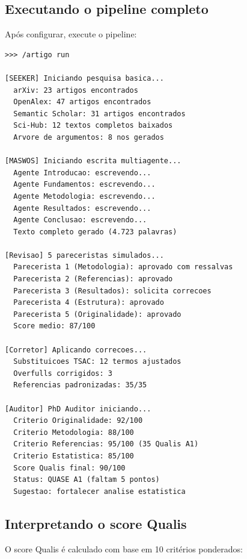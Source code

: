 \subsection{Executando o pipeline completo}
\label{subsec:exec-artigo}

Após configurar, execute o pipeline:

\begin{lstlisting}[style=bashstyle, caption={Executando o pipeline
completo de produção}, label={lst:artigo-run}]
>>> /artigo run

[SEEKER] Iniciando pesquisa basica...
  arXiv: 23 artigos encontrados
  OpenAlex: 47 artigos encontrados
  Semantic Scholar: 31 artigos encontrados
  Sci-Hub: 12 textos completos baixados
  Arvore de argumentos: 8 nos gerados

[MASWOS] Iniciando escrita multiagente...
  Agente Introducao: escrevendo...
  Agente Fundamentos: escrevendo...
  Agente Metodologia: escrevendo...
  Agente Resultados: escrevendo...
  Agente Conclusao: escrevendo...
  Texto completo gerado (4.723 palavras)

[Revisao] 5 pareceristas simulados...
  Parecerista 1 (Metodologia): aprovado com ressalvas
  Parecerista 2 (Referencias): aprovado
  Parecerista 3 (Resultados): solicita correcoes
  Parecerista 4 (Estrutura): aprovado
  Parecerista 5 (Originalidade): aprovado
  Score medio: 87/100

[Corretor] Aplicando correcoes...
  Substituicoes TSAC: 12 termos ajustados
  Overfulls corrigidos: 3
  Referencias padronizadas: 35/35

[Auditor] PhD Auditor iniciando...
  Criterio Originalidade: 92/100
  Criterio Metodologia: 88/100
  Criterio Referencias: 95/100 (35 Qualis A1)
  Criterio Estatistica: 85/100
  Score Qualis final: 90/100
  Status: QUASE A1 (faltam 5 pontos)
  Sugestao: fortalecer analise estatistica
\end{lstlisting}

\subsection{Interpretando o score Qualis}
\label{subsec:score-qualis}

O score Qualis é calculado com base em 10 critérios ponderados:

